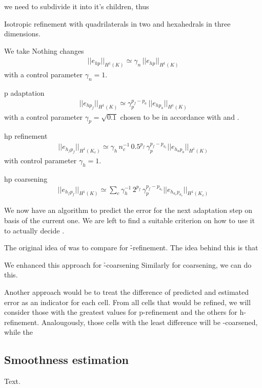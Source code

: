 we need to subdivide it into it's children, thus

Isotropic refinement with quadrilaterals in two and hexahedrals in three dimensions.

We take
Nothing changes
\begin{align}
\label{eq:nothing} ||e_{h p}||_{H^1(K)} \simeq \gamma_n \, ||e_{h p}||_{H^1(K)}
\end{align}
with a control parameter \(\gamma_n = 1\).

p adaptation
\begin{align}
\label{eq:p_adaptation} ||e_{h p_f}||_{H^1(K)} \simeq \gamma_p^{p_f-p_a} \, ||e_{h p_a}||_{H^1(K)}
\end{align}
with a control parameter \(\gamma_p = \sqrt{0.1}\) chosen to be in accordance with \cite{melenk2001} and \cite{mitchell2014}.

hp refinement
\begin{align}
\label{eq:hp_refinement} ||e_{h_f p_f}||_{H^1(K_c)} \simeq \gamma_h \, n_c^{-1} \, 0.5^{p_f} \, \gamma_p^{p_f - p_{a_c}} ||e_{h_a p_a}||_{H^1(K)}
\end{align}
with control parameter \(\gamma_h = 1\).

hp coarsening
\begin{align}
\label{eq:hp_coarsening} ||e_{h_f p_f}||_{H^1(K)} \simeq \sum\limits_{c} \gamma_h^{-1} \, 2^{p_f} \, \gamma_p^{p_f - p_{\text{a}_c}} ||e_{h_{a_c} p_{a_c}}||_{H^1(K_c)}
\end{align}


We now have an algorithm to predict the error for the next adaptation step on basis of the current one. We are left to find a suitable criterion on how to use it to actually decide .

The original idea of \cite{melenk2001} was to compare  for \h-refinement.
The idea behind this is that

We enhanced this approach for \h-coarsening
Similarly for coarsening, we can do this.

Another approach would be to treat the difference of predicted and estimated error as an indicator for each cell. From all cells that would be refined, we will consider those with the greatest values for p-refinement and the others for h-refinement. Analougously, those cells with the least difference will be \p-coarsened, while the



\subsection{Smoothness estimation}
\label{ssec:smoothness}

Text.
